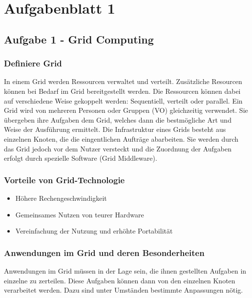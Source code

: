 \section{Aufgabenblatt 1}

\subsection{Aufgabe 1 - Grid Computing}

\subsubsection{Definiere Grid}
	In einem Grid werden Ressourcen verwaltet und verteilt.
	Zus\"atzliche Resourcen k\"onnen bei Bedarf im Grid bereitgestellt werden.
	Die Ressourcen k\"onnen dabei auf verschiedene Weise gekoppelt werden:
	Sequentiell, verteilt oder parallel.
	Ein Grid wird von mehreren Personen oder Gruppen (VO) gleichzeitig verwendet.
	Sie \"ubergeben ihre Aufgaben dem Grid, welches dann die bestm\"ogliche Art und Weise der Ausf\"uhrung ermittelt.
	Die Infrastruktur eines Grids besteht aus einzelnen Knoten,
	die die eingentlichen Auftr\"age abarbeiten.
	Sie werden durch das Grid jedoch vor dem Nutzer versteckt und die Zuordnung der
	Aufgaben erfolgt durch spezielle Software (Grid Middleware).
	
\subsubsection{Vorteile von Grid-Technologie}
	\begin{itemize}
		\item H\"ohere Rechengeschwindigkeit	
		\item Gemeinsames Nutzen von teurer Hardware
		\item Vereinfachung der Nutzung und erh\"ohte Portabilit\"at
	\end{itemize}
	
\subsubsection{Anwendungen im Grid und deren Besonderheiten}
	Anwendungen im Grid m\"ussen in der Lage sein,
	die ihnen gestellten Aufgaben in einzelne zu zerteilen.
	Diese Aufgaben k\"onnen dann von den einzelnen Knoten verarbeitet werden.
	Dazu sind unter Umst\"anden bestimmte Anpassungen n\"otig.
	
